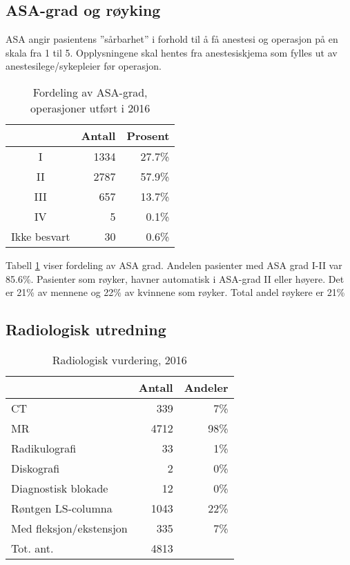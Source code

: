 \documentclass [norsk,a4paper,twoside]{article}\usepackage[]{graphicx}\usepackage[]{color}
\begin{document}
\clearpage



\subsection{ASA-grad og røyking}
ASA angir pasientens ”sårbarhet” i forhold til å få anestesi og operasjon på en skala fra 1 til 5. 
Opplysningene skal hentes fra anestesiskjema som fylles ut av anestesilege/sykepleier før operasjon.
\begin{table}[ht]
\centering
\begin{tabular}{crr}
  \hline
 & Antall & Prosent \\ 
  \hline
I & 1334 & 27.7\% \\ 
  II & 2787 & 57.9\% \\ 
  III & 657 & 13.7\% \\ 
  IV & 5 & 0.1\% \\ 
  Ikke besvart & 30 & 0.6\% \\ 
   \hline
\end{tabular}
\caption{Fordeling av ASA-grad, operasjoner utført i 2016} 
\label{tab:ASA}
\end{table}


Tabell \ref{tab:ASA} viser fordeling av ASA grad. Andelen pasienter med ASA grad I-II 
var 85.6\%. Pasienter som røyker, havner automatisk i ASA-grad II eller høyere. 
Det er 21\% av mennene og 22\% av kvinnene som røyker. 
                    Total andel røykere er 21\%



\subsection{Radiologisk utredning}

\begin{table}[ht]
\centering
\begin{tabular}{lrr}
  \hline
 & Antall & Andeler \\ 
  \hline
CT & 339 & 7\% \\ 
  MR & 4712 & 98\% \\ 
  Radikulografi & 33 & 1\% \\ 
  Diskografi & 2 & 0\% \\ 
  Diagnostisk blokade & 12 & 0\% \\ 
  Røntgen LS-columna & 1043 & 22\% \\ 
  Med fleksjon/ekstensjon & 335 & 7\% \\ 
  Tot. ant. & 4813 &   \\ 
   \hline
\end{tabular}
\caption{Radiologisk vurdering, 2016} 
\label{tab:RV}
\end{table}
\end{document}
